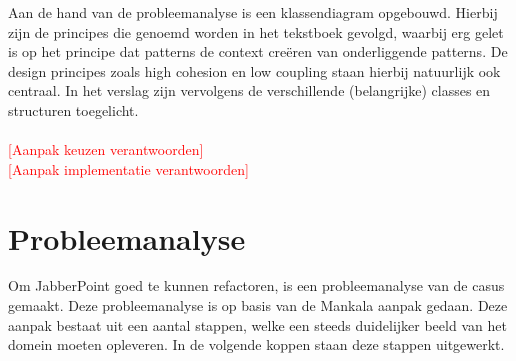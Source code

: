 \documentclass[a4paper]{article}
\newcommand{\todo}[1]{\textcolor{red}{[#1]}}
\newcommand{\1}[0]{\'{e}\'{e}n}
\begin{document}
Aan de hand van de probleemanalyse is een klassendiagram opgebouwd. Hierbij zijn de principes die genoemd worden in het tekstboek gevolgd, waarbij erg gelet is op het principe dat patterns de context creëren van onderliggende patterns. De design principes zoals high cohesion en low coupling staan hierbij natuurlijk ook centraal. In het verslag zijn vervolgens de verschillende (belangrijke) classes en structuren toegelicht.
\\\\
\todo{Aanpak keuzen verantwoorden}
\\
\todo{Aanpak implementatie verantwoorden}


\section{Probleemanalyse}
Om JabberPoint goed te kunnen refactoren, is een probleemanalyse van de casus gemaakt. Deze probleemanalyse is op basis van de Mankala aanpak gedaan. Deze aanpak bestaat uit een aantal stappen, welke een steeds duidelijker beeld van het domein moeten opleveren. In de volgende koppen staan deze stappen uitgewerkt.
\end{document}
